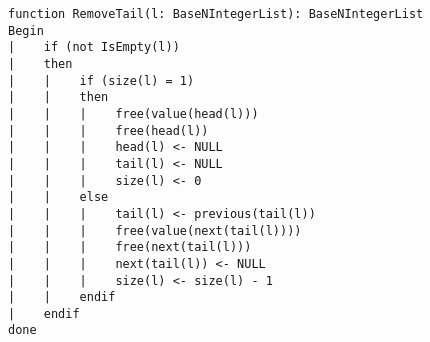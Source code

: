 \begin{lstlisting}[breaklines]
function RemoveTail(l: BaseNIntegerList): BaseNIntegerList
Begin
|    if (not IsEmpty(l))
|    then
|    |    if (size(l) = 1)
|    |    then
|    |    |    free(value(head(l)))
|    |    |    free(head(l))
|    |    |    head(l) <- NULL
|    |    |    tail(l) <- NULL
|    |    |    size(l) <- 0
|    |    else
|    |    |    tail(l) <- previous(tail(l))
|    |    |    free(value(next(tail(l))))
|    |    |    free(next(tail(l)))
|    |    |    next(tail(l)) <- NULL
|    |    |    size(l) <- size(l) - 1
|    |    endif
|    endif
done
\end{lstlisting}
